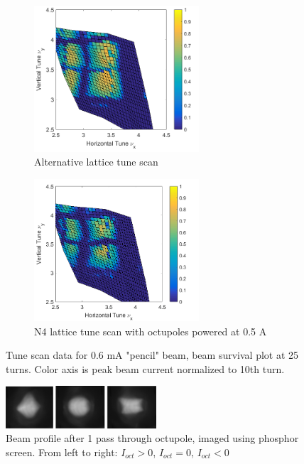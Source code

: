 \begin{figure}[!htb]
	\begin{subfigure}[]{0.5\textwidth}
	\centering
    \includegraphics*[width=174pt]{6.figures/pencil_tune_scan_plot_currentspace_Oct0}
	\caption{Alternative lattice tune scan }
	\end{subfigure}
	\begin{subfigure}[]{0.5\textwidth}
	\centering
    \includegraphics*[width=174pt]{6.figures/pencil_tune_scan_plot_currentspace_Oct5}
	\caption{N4 lattice tune scan with octupoles powered at 0.5 A}
	\end{subfigure}
 	\caption{Tune scan data for 0.6 mA "pencil" beam, beam survival plot at 25 turns. Color axis is peak beam current normalized to 10th turn.}
   \label{data}
\end{figure}

\begin{figure}[!htb]
   \centering
    \includegraphics*[width=0.5\textwidth]{6.figures/oct_profile}
 	\caption{Beam profile after 1 pass through octupole, imaged using phosphor screen. From left to right: $I_{oct} >0$, $I_{oct} =0$, $I_{oct} <0$}
   \label{profile}
\end{figure}

